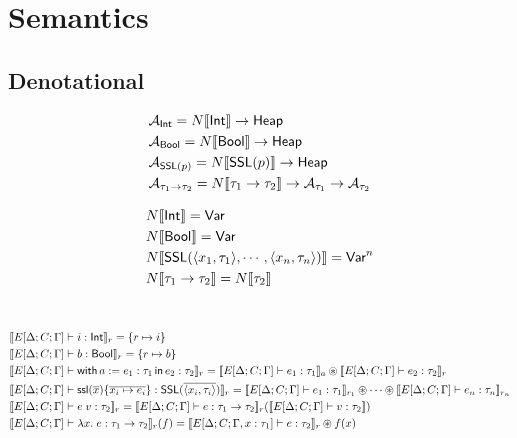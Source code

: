 \section{Semantics}

\subsection{Denotational}
\begin{align*}
  &\mathcal{A}_{\textsf{Int}} = N\llbracket \textsf{Int} \rrbracket \rightarrow \textsf{Heap}
  \\
  &\mathcal{A}_{\textsf{Bool}} = N\llbracket \textsf{Bool} \rrbracket \rightarrow \textsf{Heap}
  \\
  &\mathcal{A}_{\textsf{SSL}(p)} = N\llbracket \textsf{SSL}(p) \rrbracket \rightarrow \textsf{Heap}
  \\
  &\mathcal{A}_{\tau_1 \rightarrow \tau_2} = N\llbracket \tau_1 \rightarrow \tau_2 \rrbracket \rightarrow \mathcal{A}_{\tau_1} \rightarrow \mathcal{A}_{\tau_2}
\end{align*}

\begin{align*}
  &N\llbracket \textsf{Int} \rrbracket = \textsf{Var}
  \\
  &N\llbracket \textsf{Bool} \rrbracket = \textsf{Var}
  \\
  &N\llbracket \textsf{SSL}(\langle x_1, \tau_1 \rangle, \cdots, \langle x_n, \tau_n \rangle) \rrbracket = \textsf{Var}^n
  \\
  &N\llbracket \tau_1 \rightarrow \tau_2 \rrbracket = N\llbracket \tau_2 \rrbracket
\end{align*}
\\

\begin{center}
\end{center}
\begin{align*}
  &\sem{E[\Delta;C;\Gamma] \vdash i : \Int}_r = \{ r \mapsto i \}
  \\
  &\sem{E[\Delta;C;\Gamma] \vdash b : \Bool}_r = \{ r \mapsto b \}
  \\
  &\sem{E[\Delta;C;\Gamma] \vdash \withIn{a := e_1 : \tau_1} e_2 : \tau_2}_r = \sem{E[\Delta;C;\Gamma] \vdash e_1 : \tau_1}_a \osep \sem{E[\Delta;C;\Gamma] \vdash e_2 : \tau_2}_r
  \\
  &\sem{E[\Delta;C;\Gamma] \vdash \ssl{\overline{x}}{\overline{x_i \mapsto e_i}} : \SSL(\overline{\langle x_i, \tau_i \rangle})}_r =
    \sem{E[\Delta;C;\Gamma] \vdash e_1 : \tau_1}_{r_1} \osep \cdots \osep \sem{E[\Delta;C;\Gamma] \vdash e_n : \tau_n}_{r_n}
  \\
  &\sem{E[\Delta;C;\Gamma] \vdash e\; v : \tau_2}_r =
      \sem{E[\Delta;C;\Gamma] \vdash e : \tau_1 \ra \tau_2}_r(\sem{E[\Delta;C;\Gamma] \vdash v : \tau_2})
  \\
  &\sem{E[\Delta;C;\Gamma] \vdash \lambda x.\; e : \tau_1 \ra \tau_2}_r(f)
      = \sem{E[\Delta;C;\Gamma, x : \tau_1] \vdash e : \tau_2}_r \osep f(x)
\end{align*}

